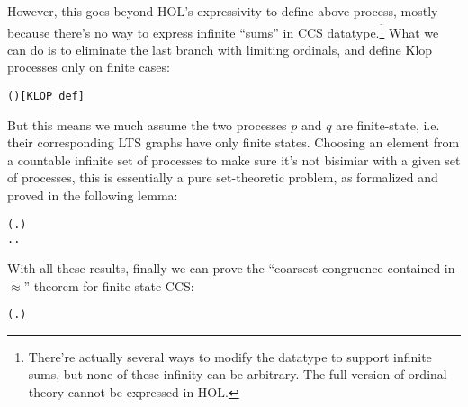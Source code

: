 However, this goes beyond HOL's expressivity to define above process, mostly
because there's no way to express infinite ``sums'' in CCS
datatype.\footnote{There're actually several ways to modify the
  datatype to support infinite sums, but none of these infinity can be
arbitrary. The full version of ordinal theory cannot be expressed in HOL.}
What we can do is to eliminate the last branch with limiting
ordinals, and define Klop processes only on finite cases:
\begin{alltt}
   \HOLSymConst{=} 
  ( ) \HOLSymConst{=}    \HOLSymConst{+}    \hfill[KLOP_def]
\end{alltt}
But this means we much assume the two processes $p$ and $q$ are
finite-state, i.e. their corresponding LTS graphs have only finite
states. Choosing an element from a countable infinite set of processes
to make sure it's not bisimiar with a given set of processes, this is
essentially a pure set-theoretic problem, as formalized and proved in
the following lemma:
\begin{alltt}
\HOLTokenTurnstile{}   \HOLSymConst{\HOLTokenImp{}}
     \HOLSymConst{\HOLTokenConj{}}   \HOLSymConst{\HOLTokenConj{}}
   (\HOLSymConst{\HOLTokenForall{}} .  \HOLSymConst{\HOLTokenIn{}}  \HOLSymConst{\HOLTokenConj{}}  \HOLSymConst{\HOLTokenIn{}}  \HOLSymConst{\HOLTokenConj{}}  \HOLSymConst{\HOLTokenNotEqual{}}  \HOLSymConst{\HOLTokenImp{}} \HOLSymConst{\HOLTokenNeg{}}  ) \HOLSymConst{\HOLTokenImp{}}
   \HOLSymConst{\HOLTokenExists{}}.  \HOLSymConst{\HOLTokenIn{}}  \HOLSymConst{\HOLTokenConj{}} \HOLSymConst{\HOLTokenForall{}}.  \HOLSymConst{\HOLTokenIn{}}  \HOLSymConst{\HOLTokenImp{}} \HOLSymConst{\HOLTokenNeg{}}  
\end{alltt}

With all these results, finally we can prove the ``coarsest congruence
contained in $\approx$'' theorem for finite-state CCS:
\begin{alltt}
\HOLTokenTurnstile{}   \HOLSymConst{\HOLTokenConj{}}   \HOLSymConst{\HOLTokenImp{}}
   ( \HOLSymConst{\HOLTokenObsCongr}  \HOLSymConst{\HOLTokenEquiv{}} \HOLSymConst{\HOLTokenForall{}}.  \HOLSymConst{+}  \HOLSymConst{\HOLTokenWeakEQ}  \HOLSymConst{+} )
\end{alltt}

